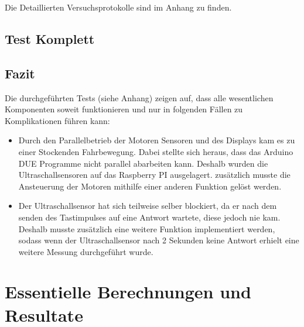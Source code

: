 \documentclass[a4paper]{report}
\begin{document}

Die Detaillierten Versuchsprotokolle sind im Anhang zu finden.

\section{Test Komplett}

\section{Fazit}

Die durchgeführten Tests (siehe Anhang) zeigen auf, dass alle wesentlichen
Komponenten soweit funktionieren und nur in folgenden Fällen zu Komplikationen führen kann:\\

\begin{itemize}
	\item Durch den Parallelbetrieb der Motoren Sensoren und des Displays kam es zu einer Stockenden Fahrbewegung. Dabei stellte sich heraus, dass das Arduino DUE Programme nicht parallel abarbeiten kann. Deshalb wurden die Ultraschallsensoren auf das Raspberry PI ausgelagert. zusätzlich musste die Ansteuerung der Motoren mithilfe einer anderen Funktion gelöst werden.
	\item Der Ultraschallsensor hat sich teilweise selber blockiert, da er nach dem senden des Tastimpulses auf eine Antwort wartete, diese jedoch nie kam. Deshalb musste zusätzlich eine weitere Funktion implementiert werden, sodass wenn der Ultraschallsensor nach 2 Sekunden keine Antwort erhielt eine weitere Messung durchgeführt wurde.
\end{itemize}

\chapter{Essentielle Berechnungen und Resultate}
\label{sec:EssBerechnung}
\end{document}
